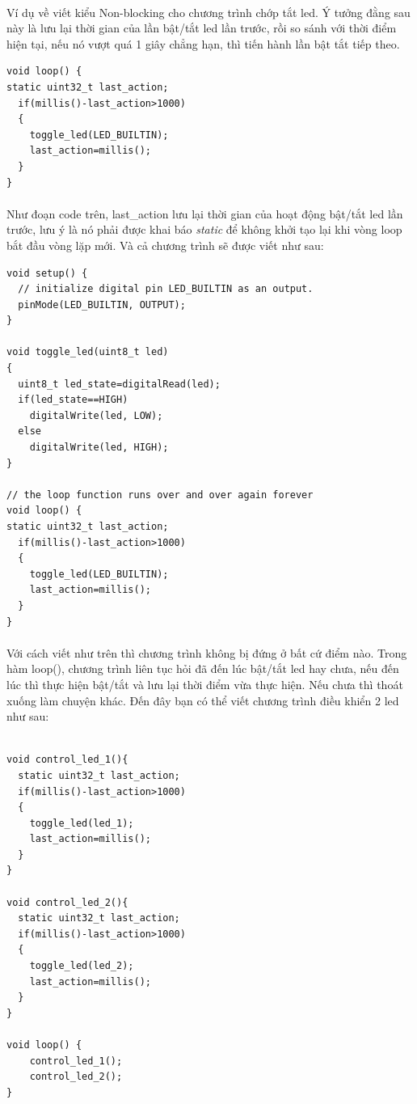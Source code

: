 \documentclass[12pt,a5paper]{book}
\begin{document}
\paragraph{}
Ví dụ về viết kiểu Non-blocking cho chương trình chớp tắt led. Ý tưởng đằng sau này là lưu lại thời gian của lần bật/tắt led lần trước, rồi so sánh với thời điểm hiện tại, nếu nó vượt quá 1 giây chẳng hạn, thì tiến hành lần bật tắt tiếp theo.
\begin{lstlisting}
void loop() {
static uint32_t last_action;
  if(millis()-last_action>1000)
  {
    toggle_led(LED_BUILTIN);
    last_action=millis();
  }
}
\end{lstlisting}
\paragraph{}
Như đoạn code trên, last\_action lưu lại thời gian của hoạt động bật/tắt led lần trước, lưu ý là nó phải được khai báo \textit{static} để không khởi tạo lại khi vòng loop bắt đầu vòng lặp mới. Và cả chương trình sẽ được viết như sau: 
\begin{lstlisting}
void setup() {
  // initialize digital pin LED_BUILTIN as an output.
  pinMode(LED_BUILTIN, OUTPUT);
}

void toggle_led(uint8_t led)
{
  uint8_t led_state=digitalRead(led);
  if(led_state==HIGH)
    digitalWrite(led, LOW);
  else
    digitalWrite(led, HIGH);
}

// the loop function runs over and over again forever
void loop() {
static uint32_t last_action;
  if(millis()-last_action>1000)
  {
    toggle_led(LED_BUILTIN);
    last_action=millis();
  }
}
\end{lstlisting}
\paragraph{}
Với cách viết như trên thì chương trình không bị đứng ở bất cứ điểm nào. Trong hàm loop(), chương trình liên tục hỏi đã đến lúc bật/tắt led hay chưa, nếu đến lúc thì thực hiện bật/tắt và lưu lại thời điểm vừa thực hiện. Nếu chưa thì thoát xuống làm chuyện khác. Đến đây bạn có thể viết chương trình điều khiển 2 led như sau:

\begin{lstlisting}

void control_led_1(){
  static uint32_t last_action;
  if(millis()-last_action>1000)
  {
    toggle_led(led_1);
    last_action=millis();
  }	
}

void control_led_2(){
  static uint32_t last_action;
  if(millis()-last_action>1000)
  {
    toggle_led(led_2);
    last_action=millis();
  }	
}

void loop() {
	control_led_1();
	control_led_2();
}
\end{lstlisting}
\end{document}
